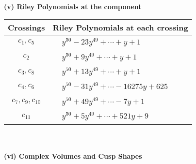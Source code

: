 \documentclass[1p]{elsarticle_modified}
\theoremstyle{definition}
\begin{document}
\newpage\renewcommand{\arraystretch}{1}
\flushleft \textbf{(v) Riley Polynomials at the component}\newline \\
\begin{tabular}{m{50pt}|m{274pt}}
Crossings & \hspace{64pt}Riley Polynomials at each crossing \\
\hline $$\begin{aligned}c_{1},c_{5}\end{aligned}$$&$\begin{aligned}
&y^{50}-23 y^{49}+\cdots+y+1
\end{aligned}$\\
\hline $$\begin{aligned}c_{2}\end{aligned}$$&$\begin{aligned}
&y^{50}+9 y^{49}+\cdots+y+1
\end{aligned}$\\
\hline $$\begin{aligned}c_{3},c_{8}\end{aligned}$$&$\begin{aligned}
&y^{50}+13 y^{49}+\cdots+y+1
\end{aligned}$\\
\hline $$\begin{aligned}c_{4},c_{6}\end{aligned}$$&$\begin{aligned}
&y^{50}-31 y^{49}+\cdots-16275 y+625
\end{aligned}$\\
\hline $$\begin{aligned}c_{7},c_{9},c_{10}\end{aligned}$$&$\begin{aligned}
&y^{50}+49 y^{49}+\cdots-7 y+1
\end{aligned}$\\
\hline $$\begin{aligned}c_{11}\end{aligned}$$&$\begin{aligned}
&y^{50}+5 y^{49}+\cdots+521 y+9
\end{aligned}$\\
\hline
\end{tabular}\\~\\
\newpage\flushleft \textbf{(vi) Complex Volumes and Cusp Shapes}
\end{document}
